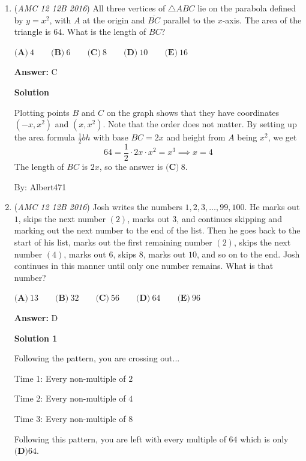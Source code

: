 \begin{enumerate}
 


	\item (\textit{AMC 12 12B 2016}) All three vertices of $\bigtriangleup ABC$ lie on the parabola defined by $y=x^2$, with $A$ at the origin and $\overline{BC}$ parallel to the $x$-axis. The area of the triangle is $64$. What is the length of $BC$?  


 $\textbf{(A)}\ 4\qquad\textbf{(B)}\ 6\qquad\textbf{(C)}\ 8\qquad\textbf{(D)}\ 10\qquad\textbf{(E)}\ 16$

 \textbf{Answer: }C



\textbf{Solution}

Plotting points $B$ and $C$ on the graph shows that they have coordinates $\left( -x,x^2\right)$ and $\left( x,x^2\right)$. Note that the order does not matter. By setting up the area formula $\frac{1}{2} bh$ with base $BC = 2x$ and height from $A$ being $x^2$, we get
 \[64=\frac{1}{2} \cdot 2x\cdot x^2 =x^3 \implies x = 4\]The length of $BC$ is $2x$, so the answer is $\boxed{\textbf{(C)}\ 8}$.

 By: Albert471

 


	\item (\textit{AMC 12 12B 2016}) Josh writes the numbers $1,2,3,\dots,99,100$. He marks out $1$, skips the next number $(2)$, marks out $3$, and continues skipping and marking out the next number to the end of the list. Then he goes back to the start of his list, marks out the first remaining number $(2)$, skips the next number $(4)$, marks out $6$, skips $8$, marks out $10$, and so on to the end. Josh continues in this manner until only one number remains. What is that number?


 $\textbf{(A)}\ 13 \qquad \textbf{(B)}\ 32 \qquad \textbf{(C)}\ 56 \qquad \textbf{(D)}\ 64 \qquad \textbf{(E)}\ 96$

 \textbf{Answer: }D



\textbf{Solution 1}

Following the pattern, you are crossing out...

 Time 1: Every non-multiple of $2$

 Time 2: Every non-multiple of $4$

 Time 3: Every non-multiple of $8$

 Following this pattern, you are left with every multiple of $64$ which is only $\boxed{\textbf{(D)}64}$.

 




\end{enumerate}
